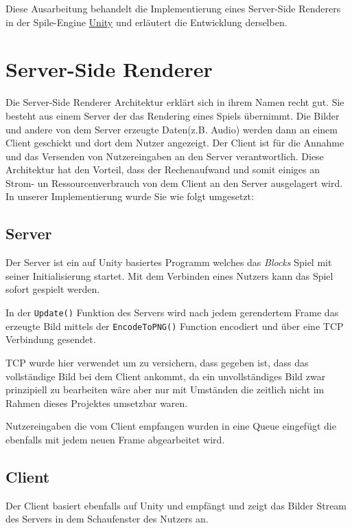 \documentclass[11pt,parskip=full]{scrartcl}
\begin{document}
Diese Ausarbeitung behandelt die Implementierung eines Server-Side Renderers in der Spile-Engine \href{https://unity.com/}{Unity} und erläutert die Entwicklung derselben.

\section{Server-Side Renderer}

Die Server-Side Renderer Architektur erklärt sich in ihrem Namen recht gut. Sie besteht aus einem Server der das Rendering eines Spiels übernimmt. Die Bilder und andere von dem Server erzeugte Daten(z.B. Audio) werden dann an einem Client geschickt und dort dem Nutzer angezeigt. Der Client ist für die Annahme und das Versenden von Nutzereingaben an den Server verantwortlich. Diese Architektur hat den Vorteil, dass der Rechenaufwand und somit einiges an Strom- un Ressourcenverbrauch von dem Client an den Server ausgelagert wird. In unserer Implementierung wurde Sie wie folgt umgesetzt:

\subsection{Server}

Der Server ist ein auf Unity basiertes Programm welches das \textit{Blocks} Spiel mit seiner Initialisierung startet. Mit dem Verbinden eines Nutzers kann das Spiel sofort gespielt werden.

In der \lstinline{Update()} Funktion des Servers wird nach jedem gerendertem Frame das erzeugte Bild mittels der \lstinline{EncodeToPNG()} Function encodiert und über eine TCP Verbindung gesendet.

TCP wurde hier verwendet um zu versichern, dass gegeben ist, dass das vollständige Bild bei dem Client ankommt, da ein unvollständiges Bild zwar prinzipiell zu bearbeiten wäre aber nur mit Umständen die zeitlich nicht im Rahmen dieses Projektes umsetzbar waren.

Nutzereingaben die vom Client empfangen wurden in eine Queue eingefügt die ebenfalls mit jedem neuen Frame abgearbeitet wird.

\subsection{Client}

Der Client basiert ebenfalls auf Unity und empfängt und zeigt das Bilder Stream des Servers in dem Schaufenster des Nutzers an.
\end{document}

